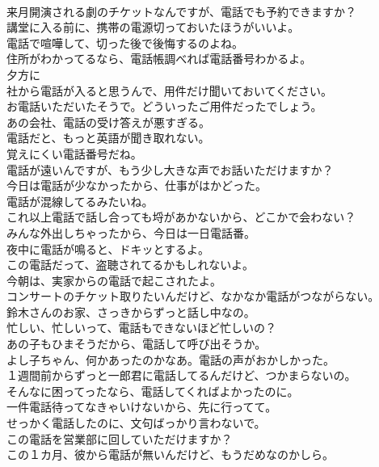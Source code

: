 \documentclass[8pt]{extreport}
\begin{document}
\begin{CJK}{UTF8}{min}
\\	来月開演される劇のチケットなんですが、電話でも予約できますか？	
\\	講堂に入る前に、携帯の電源切っておいたほうがいいよ。	
\\	電話で喧嘩して、切った後で後悔するのよね。	
\\	住所がわかってるなら、電話帳調べれば電話番号わかるよ。	
\\	夕方に
\\	社から電話が入ると思うんで、用件だけ聞いておいてください。	
\\	お電話いただいたそうで。どういったご用件だったでしょう。	
\\	あの会社、電話の受け答えが悪すぎる。	
\\	電話だと、もっと英語が聞き取れない。	
\\	覚えにくい電話番号だね。	
\\	電話が遠いんですが、もう少し大きな声でお話いただけますか？	
\\	今日は電話が少なかったから、仕事がはかどった。	
\\	電話が混線してるみたいね。	
\\	これ以上電話で話し合っても埒があかないから、どこかで会わない？	
\\	みんな外出しちゃったから、今日は一日電話番。	
\\	夜中に電話が鳴ると、ドキッとするよ。	
\\	この電話だって、盗聴されてるかもしれないよ。	
\\	今朝は、実家からの電話で起こされたよ。	
\\	コンサートのチケット取りたいんだけど、なかなか電話がつながらない。	
\\	鈴木さんのお家、さっきからずっと話し中なの。	
\\	忙しい、忙しいって、電話もできないほど忙しいの？	
\\	あの子もひまそうだから、電話して呼び出そうか。	
\\	よし子ちゃん、何かあったのかなあ。電話の声がおかしかった。	
\\	１週間前からずっと一郎君に電話してるんだけど、つかまらないの。	
\\	そんなに困ってったなら、電話してくればよかったのに。	
\\	一件電話待ってなきゃいけないから、先に行ってて。	
\\	せっかく電話したのに、文句ばっかり言わないで。	
\\	この電話を営業部に回していただけますか？	
\\	この１カ月、彼から電話が無いんだけど、もうだめなのかしら。	

\end{CJK}
\end{document}
